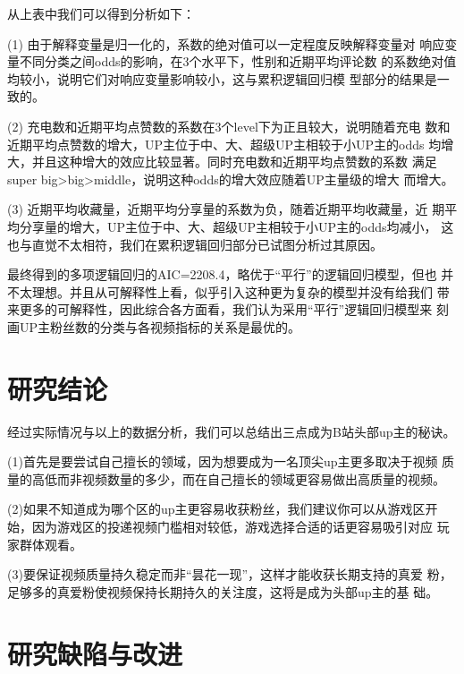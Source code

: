 \documentclass{ctexart}
\begin{document}
从上表中我们可以得到分析如下：

(1) 由于解释变量是归一化的，系数的绝对值可以一定程度反映解释变量对
响应变量不同分类之间odds的影响，在3个水平下，性别和近期平均评论数
的系数绝对值均较小，说明它们对响应变量影响较小，这与累积逻辑回归模
型部分的结果是一致的。

(2) 充电数和近期平均点赞数的系数在3个level下为正且较大，说明随着充电
数和近期平均点赞数的增大，UP主位于中、大、超级UP主相较于小UP主的odds
均增大，并且这种增大的效应比较显著。同时充电数和近期平均点赞数的系数
满足super big>big>middle，说明这种odds的增大效应随着UP主量级的增大
而增大。

(3) 近期平均收藏量，近期平均分享量的系数为负，随着近期平均收藏量，近
期平均分享量的增大，UP主位于中、大、超级UP主相较于小UP主的odds均减小，
这也与直觉不太相符，我们在累积逻辑回归部分已试图分析过其原因。

最终得到的多项逻辑回归的AIC=2208.4，略优于“平行”的逻辑回归模型，但也
并不太理想。并且从可解释性上看，似乎引入这种更为复杂的模型并没有给我们
带来更多的可解释性，因此综合各方面看，我们认为采用“平行”逻辑回归模型来
刻画UP主粉丝数的分类与各视频指标的关系是最优的。

\section{研究结论}

经过实际情况与以上的数据分析，我们可以总结出三点成为B站头部up主的秘诀。

(1)首先是要尝试自己擅长的领域，因为想要成为一名顶尖up主更多取决于视频
质量的高低而非视频数量的多少，而在自己擅长的领域更容易做出高质量的视频。

(2)如果不知道成为哪个区的up主更容易收获粉丝，我们建议你可以从游戏区开
始，因为游戏区的投递视频门槛相对较低，游戏选择合适的话更容易吸引对应
玩家群体观看。

(3)要保证视频质量持久稳定而非“昙花一现”，这样才能收获长期支持的真爱
粉，足够多的真爱粉使视频保持长期持久的关注度，这将是成为头部up主的基
础。

\section{研究缺陷与改进}
\end{document}
